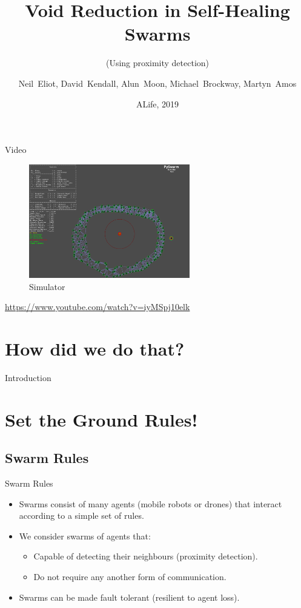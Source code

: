 \documentclass{beamer}
\title{Void Reduction in Self-Healing Swarms}
\subtitle{(Using proximity detection)}
\author{Neil~Eliot\inst{1}, David~Kendall\inst{1}, Alun~Moon\inst{1}, Michael~Brockway\inst{1}, Martyn~Amos\inst{1}}
\institute[Northumbria University] %
{
  \inst{1}
  Department of Computer and Information Sciences\\
  University of Northumbria
}
\date{ALife, 2019}
\begin{document}
\begin{frame}
  \titlepage
\end{frame}

\begin{frame}{Video}
  \begin{center}
    \begin{figure}
      \begin{center}
        \includegraphics[width=7cm]{Simulator.pdf}
      \end{center}
      \caption{Simulator}
    \end{figure}
    \href{https://www.youtube.com/watch?v=iyMSpj10elk}{https://www.youtube.com/watch?v=iyMSpj10elk}
  \end{center}
\end{frame}  
\section{How did we do that?
}
\begin{frame}{Introduction}
  \tableofcontents
\end{frame}


\section{Set the Ground Rules!}
\subsection{Swarm Rules}

\begin{frame}{Swarm Rules}
  \begin{itemize}
  \item {
    Swarms consist of many agents (mobile robots or drones) that interact according to a simple set of rules.
  }
  \item {
    We consider swarms of agents that:
    \begin{itemize}
      \item Capable of detecting their neighbours (proximity detection). 
      \item Do not require any another form of communication. 
    \end{itemize}
  }
  \item {
    Swarms can be made fault tolerant (resilient to agent loss).
  }
  \end{itemize}
\end{frame}
\end{document}
